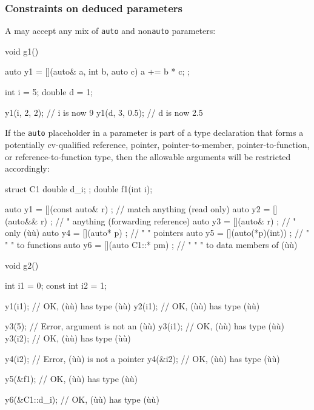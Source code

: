\subsubsection[Constraints on deduced parameters]{Constraints on deduced parameters}\label{constraints-on-deduced-parameters}

A  may accept any mix of \lstinline!auto! and
non\lstinline!auto! parameters:

\begin{emcppslisting}
void g1()
{
    auto y1 = [](auto& a, int b, auto c) { a += b * c; };

    int    i = 5;
    double d = 1;

    y1(i, 2, 2);    // i is now 9
    y1(d, 3, 0.5);  // d is now 2.5
}
\end{emcppslisting}
    

\noindent If the \lstinline!auto! placeholder in a  parameter
is part of a type declaration that forms a potentially cv-qualified
reference, pointer, pointer-to-member, pointer-to-function, or
reference-to-function type, then the allowable arguments will be
restricted accordingly:

\begin{emcppslisting}
struct C1 { double d_i; };
double f1(int i);

auto y1 = [](const auto& r) { };  // match anything (read only)
auto y2 = [](auto&& r)      { };  //   "   anything (forwarding reference)
auto y3 = [](auto& r)       { };  //   "   only (ù{}ù)
auto y4 = [](auto* p)       { };  //   "     "  pointers
auto y5 = [](auto(*p)(int)) { };  //   "     "      "    to functions
auto y6 = [](auto C1::* pm) { };  //   "     "      "    to data members of (ù{}ù)

void g2()
{
    int       i1 = 0;
    const int i2 = 1;

    y1(i1);        // OK, (ù{}ù) has type (ù{}ù)
    y2(i1);        // OK, (ù{}ù) has type (ù{}ù)

    y3(5);         // Error, argument is not an (ù{}ù)
    y3(i1);        // OK, (ù{}ù) has type (ù{}ù)
    y3(i2);        // OK, (ù{}ù) has type (ù{}ù)

    y4(i2);        // Error, (ù{}ù) is not a pointer
    y4(&i2);       // OK, (ù{}ù) has type (ù{}ù)

    y5(&f1);       // OK, (ù{}ù) has type (ù{}ù)

    y6(&C1::d_i);  // OK, (ù{}ù) has type (ù{}ù)
}
\end{emcppslisting}
    

